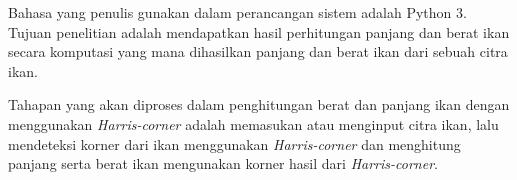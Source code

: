 Bahasa yang penulis gunakan dalam perancangan sistem adalah Python 3. 
Tujuan penelitian adalah mendapatkan hasil perhitungan panjang dan berat ikan secara komputasi yang mana dihasilkan panjang dan berat ikan dari sebuah citra ikan. 

Tahapan yang akan diproses dalam penghitungan berat dan panjang ikan dengan menggunakan \emph{Harris-corner} adalah memasukan atau menginput citra ikan, lalu mendeteksi korner dari ikan menggunakan \emph{Harris-corner} dan menghitung panjang serta berat ikan mengunakan korner hasil dari \emph{Harris-corner}. 



